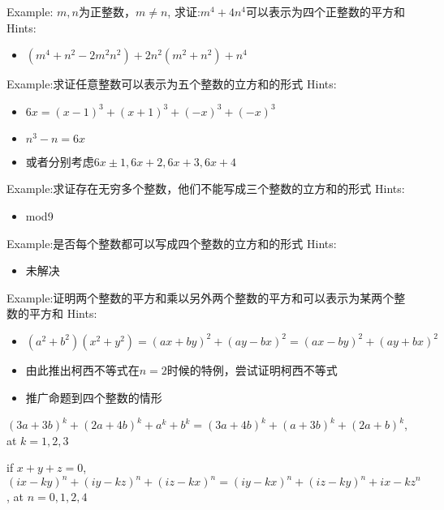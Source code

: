 \clearpage
Example: $m,n$为正整数，$m\neq n$, 求证:$m^4+4n^4$可以表示为四个正整数的平方和  
\clearpage
Hints:
\begin{itemize}
\item $(m^4+n^2-2m^2n^2)+2n^2(m^2+n^2)+n^4$
\end{itemize}


\clearpage
Example:求证任意整数可以表示为五个整数的立方和的形式 
\clearpage
Hints:
\begin{itemize}
\item $6x=(x-1)^3+(x+1)^3+(-x)^3+(-x)^3$
\item $n^3-n=6x$ 
\item 或者分别考虑$6x\pm1, 6x+2, 6x+3, 6x+4$
\end{itemize}


\clearpage
Example:求证存在无穷多个整数，他们不能写成三个整数的立方和的形式 
\clearpage
Hints:
\begin{itemize}
\item mod9 
\end{itemize}


\clearpage
Example:是否每个整数都可以写成四个整数的立方和的形式 
\clearpage
Hints:
\begin{itemize}
\item 未解决 
\end{itemize}


\clearpage
Example:证明两个整数的平方和乘以另外两个整数的平方和可以表示为某两个整数的平方和 
\clearpage
Hints:
\begin{itemize}
\item $(a^2+b^2)(x^2+y^2)=(ax+by)^2+(ay-bx)^2=(ax-by)^2+(ay+bx)^2$
\item 由此推出柯西不等式在$n=2$时候的特例，尝试证明柯西不等式
\item 推广命题到四个整数的情形
\end{itemize}


\clearpage
$(3a+3b)^k+(2a+4b)^k+a^k+b^k=(3a+4b)^k+(a+3b)^k+(2a+b)^k$, at $k=1,2,3$

if $x+y+z=0$, 
$(ix-ky)^n+(iy-kz)^n+(iz-kx)^n=(iy-kx)^n+(iz-ky)^n+{ix-kz}^n$, at $n=0,1,2,4$

